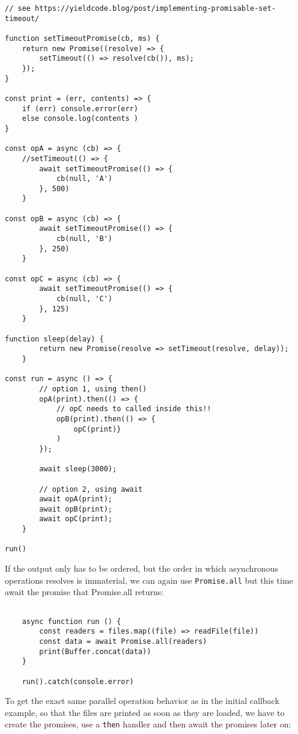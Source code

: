 \documentclass{scrartcl}
\begin{document}
\begin{lstlisting}[style=ES6]
// see https://yieldcode.blog/post/implementing-promisable-set-timeout/

function setTimeoutPromise(cb, ms) {
    return new Promise((resolve) => {
        setTimeout(() => resolve(cb()), ms);
    });
}

const print = (err, contents) => {
    if (err) console.error(err)
    else console.log(contents )
}

const opA = async (cb) => {
    //setTimeout(() => {
        await setTimeoutPromise(() => {
            cb(null, 'A')
        }, 500)
    }

const opB = async (cb) => {
        await setTimeoutPromise(() => {
            cb(null, 'B')
        }, 250)
    }

const opC = async (cb) => {
        await setTimeoutPromise(() => {
            cb(null, 'C')
        }, 125)
    }

function sleep(delay) {
        return new Promise(resolve => setTimeout(resolve, delay));
    }

const run = async () => {
        // option 1, using then()
        opA(print).then(() => {
            // opC needs to called inside this!!
            opB(print).then(() => {
                opC(print)}
            )
        });

        await sleep(3000);

        // option 2, using await
        await opA(print);
        await opB(print);
        await opC(print);
    }

run()
\end{lstlisting}

If the output only has to be ordered, but the order in which asynchronous operations resolves is immaterial, we can again use \lstinline|Promise.all| but this time await the promise that Promise.all returns:

\begin{lstlisting}[style=ES6]

    async function run () {
        const readers = files.map((file) => readFile(file))
        const data = await Promise.all(readers)
        print(Buffer.concat(data))
    }

    run().catch(console.error)

\end{lstlisting}

To get the exact same parallel operation behavior as in the initial callback example, so that the files are printed as soon as they are loaded, we have to create the promises, use a \lstinline|then| handler and then await the promises later on:
\end{document}
